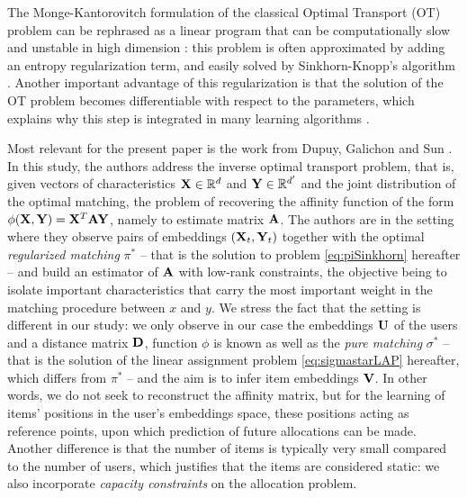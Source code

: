 The Monge-Kantorovitch formulation of the classical Optimal Transport (OT) problem can be rephrased as a linear program that can be computationally slow and unstable in high dimension \cite{cuturi_sinkhorn_2013}: this problem is often approximated by adding an entropy regularization term, and easily solved by Sinkhorn-Knopp's algorithm \cite{cuturi_sinkhorn_2013}. Another important advantage of this regularization is that the solution of the OT problem becomes differentiable with respect to the parameters, which explains why this step is integrated in many learning algorithms \cite{genevay_learning_2017,cuturi_soft-dtw_2018,tai_sinkhorn_2021}.

Most relevant for the present paper is the work from Dupuy, Galichon and Sun \cite{dupuy_estimating_2016}. In this study, the authors address the inverse optimal transport problem, that is, given vectors of characteristics $\mathbf{X} \in \mathbb{R}^d$ and $\mathbf{Y} \in \mathbb{R}^{d'}$ and the joint distribution of the optimal matching, the problem of recovering the affinity function of the form $\phi(\mathbf{X},\mathbf{Y})=\mathbf{X}^T \mathbf{A} \mathbf{Y}$, namely to estimate matrix $\mathbf{A}$. The authors are in the setting where they observe pairs of embeddings $(\mathbf{X}_t,\mathbf{Y}_t)$ together with the optimal \emph{regularized matching} $\pi^*$ -- that is the solution to problem \eqref{eq:piSinkhorn} hereafter -- and build an estimator of $\mathbf{A}$ with low-rank constraints, the objective being to isolate important characteristics that carry the most important weight in the matching procedure between $x$ and $y$. We stress the fact that the setting is different in our study:
we only observe in our case the embeddings $\mathbf{U}$ of the users and a distance matrix $\mathbf{D}$, function $\phi$ is known as well as the \emph{pure matching} $\sigma^*$ -- that is the solution of the linear assignment problem \eqref{eq:sigmastarLAP} hereafter, which differs from $\pi^*$ -- and the aim is to infer item embeddings $\mathbf{V}$. In other words, we do not seek to reconstruct the affinity matrix, but for the learning of items' positions in the user's embeddings space, these positions acting as reference points, upon which prediction of future allocations can be made. Another difference is that the number of items is typically very small compared to the number of users, which justifies that the items are considered static: we also incorporate \emph{capacity constraints} on the allocation problem.

